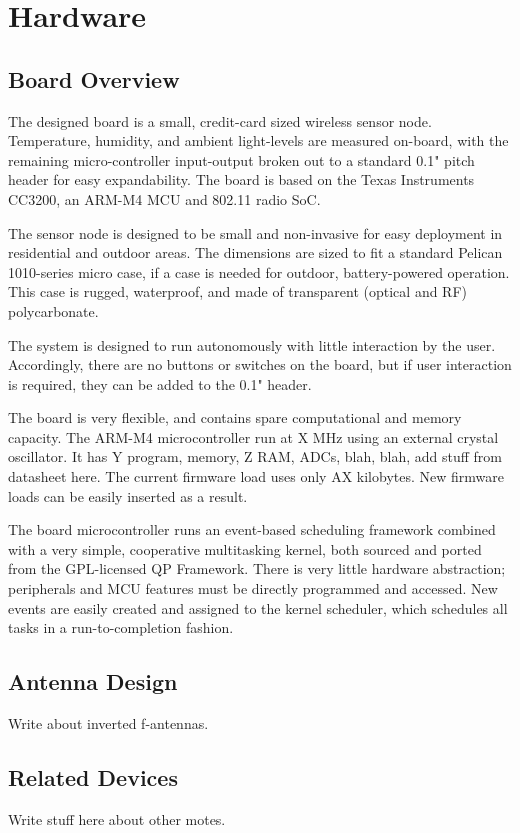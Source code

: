 \chapter{Hardware}

\section{Board Overview}
The designed board is a small, credit-card sized wireless sensor node. Temperature, humidity, and ambient light-levels are measured on-board, with the remaining micro-controller input-output broken out to a standard 0.1" pitch header for easy expandability. The board is based on the Texas Instruments CC3200, an ARM-M4 MCU and 802.11 radio SoC. 


The sensor node is designed to be small and non-invasive for easy deployment in residential and outdoor areas. The dimensions are sized to fit a standard Pelican 1010-series micro case, if a case is needed for outdoor, battery-powered operation. This case is rugged, waterproof, and made of transparent (optical and RF) polycarbonate.

The system is designed to run autonomously with little interaction by the user. Accordingly, there are no buttons or switches on the board, but if user interaction is required, they can be added to the 0.1" header.

The board is very flexible, and contains spare computational and memory capacity. The ARM-M4 microcontroller run at X MHz using an external crystal oscillator. It has Y program, memory, Z RAM, ADCs, blah, blah, add stuff from datasheet here. The current firmware load uses only AX kilobytes. New firmware loads can be easily inserted as a result.


The board microcontroller runs an event-based scheduling framework combined with a very simple, cooperative multitasking kernel, both sourced and ported from the GPL-licensed QP Framework\cite{qp framework}. There is very little hardware abstraction; peripherals and MCU features must be directly programmed and accessed. New events are easily created and assigned to the kernel scheduler, which schedules all tasks in a run-to-completion fashion. 

\section{Antenna Design}

Write about inverted f-antennas.

\section{Related Devices}

Write stuff here about other motes.


